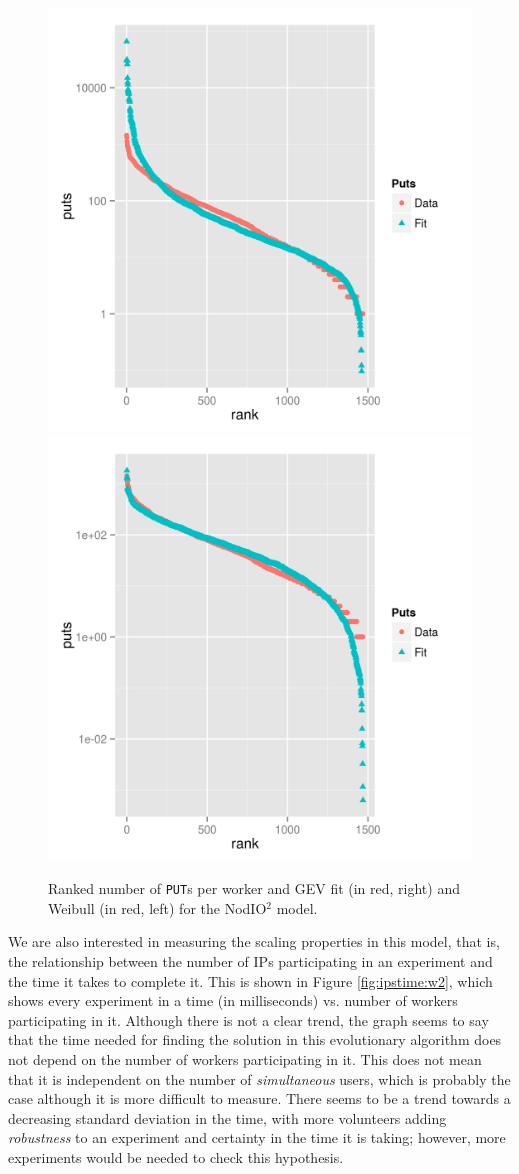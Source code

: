\documentclass[journal,onecolumn]{IEEEtran}
\begin{document}
\begin{figure}[!htb]
\centering
\includegraphics[width=0.49\linewidth]{gev-fit-ww.png}
\includegraphics[width=0.49\linewidth]{weibull-fit-ww.png}
\caption{Ranked number of {\tt PUT}s per worker and GEV fit (in red, right) and Weibull (in red, left) for the {\sf NodIO$^2$} model.}  
\label{fig:gev:w2}
\end{figure}
%
We are also interested in measuring the scaling properties in this
model, that is, the relationship between the number of IPs
participating in an experiment and the time it takes to complete
it. This is shown in Figure \ref{fig:ipstime:w2}, which shows every
experiment in a time (in milliseconds) vs. number of workers participating
in it. Although there is not a clear trend, the graph seems to say
that the time needed for finding the solution in this evolutionary
algorithm does not depend on the number of workers participating in
it. This does not mean that it is independent on the number of {\em
  simultaneous} users, which is probably the case although it is more
difficult to measure. There seems to be a trend towards a decreasing
standard deviation in the time, with more volunteers adding {\em
  robustness} to an experiment and certainty in the time it is taking;
however, more experiments would be needed to check this hypothesis.
\end{document}
